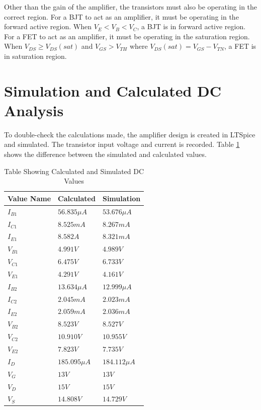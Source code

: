 \documentclass{article}
\begin{document}
Other than the gain of the amplifier, the transistors must also be operating in the correct region.
For a BJT to act as an amplifier, it must be operating in the forward active region.
When $V_{E} < V_{B} < V_{C}$, a BJT is in forward active region.
For a FET to act as an amplifier, it must be operating in the saturation region.
When $V_{DS} \ge V_{DS}(sat)$ and $V_{GS} > V_{TH}$ where $V_{DS}(sat) = V_{GS} - V_{TN}$, a FET is in saturation region.



\section{Simulation and Calculated DC Analysis}
\label{sec:dc-analysis}

To double-check the calculations made, the amplifier design is created in LTSpice and simulated.
The transistor input voltage and current is recorded.
Table \ref{tab:sim-cal-dc-values} shows the difference between the simulated and calculated values.

\begin{table}[H]
    \caption{Table Showing Calculated and Simulated DC Values}
    \label{tab:sim-cal-dc-values}
    \centering
    \begin{tabular}{ l l l}
        \hline
        Value Name & Calculated       & Simulation       \\
        \hline
        $I_{B1}$   & $56.835 \mu{A}$  & $53.676 \mu{A}$  \\
        $I_{C1}$   & $8.525 mA$       & $8.267 mA$       \\
        $I_{E1}$   & $8.582 A$        & $8.321 mA$       \\
        $V_{B1}$   & $4.991 V$        & $4.989 V$        \\
        $V_{C1}$   & $6.475 V$        & $6.733 V$        \\
        $V_{E1}$   & $4.291 V$        & $4.161 V$        \\
        \hline
        $I_{B2}$   & $13.634 \mu{A}$  & $12.999 \mu{A}$  \\
        $I_{C2}$   & $2.045 mA$       & $2.023 mA$       \\
        $I_{E2}$   & $2.059 mA$       & $2.036 mA$       \\
        $V_{B2}$   & $8.523 V$        & $8.527 V$        \\
        $V_{C2}$   & $10.910 V$       & $10.955 V$       \\
        $V_{E2}$   & $7.823 V$        & $7.735 V$        \\
        \hline
        $I_{D}$    & $185.095 \mu{A}$ & $184.112 \mu{A}$ \\
        $V_{G}$    & $13 V$           & $13 V$           \\
        $V_{D}$    & $15 V$           & $15 V$           \\
        $V_{S}$    & $14.808 V$       & $14.729 V$       \\
        \hline
    \end{tabular}
\end{table}
\end{document}
